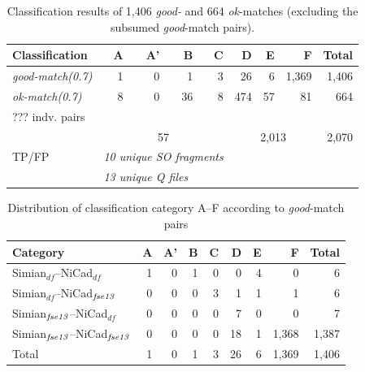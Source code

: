 \documentclass{IEEEtran}
\begin{document}
\begin{table}[H]
	\centering
	\caption{Classification results of 1,406 \textit{good-} and 664 \textit{ok}-matches (excluding the subsumed \textit{good}-match pairs).}
	\label{tab:classification}
	\begin{tabular}{|l|r|r|r|r|r|r|r|r|}
		\hline 
		Classification & A & A' & B & C & D & E & F & Total \\ 
		\hline 
		\multirow{1}{*}{\textit{good-match(0.7)}} & 1 & 0 & 1 & 3 & 26 & 6 & 1,369 & 1,406 \\ \cline{2-8}
		\hline
		\multirow{1}{*}{\textit{ok-match(0.7)}} & 8  & 0 & 36 & 8 & 474 & 57 & 81 & 664 \\ \cline{2-8}
		\hline
		\multirow{1}{*}{??? indv. pairs} &  & &  &  &  &  &  &  \\
		\hline
		\multirow{3}{*}{TP/FP} & \multicolumn{4}{c|}{57} & \multicolumn{3}{c|}{2,013} & 2,070 \\ 
	    & \multicolumn{4}{l|}{\textit{10 unique SO fragments}} & \multicolumn{3}{c|}{} & \\
	    & \multicolumn{4}{l|}{\textit{13 unique Q files}} & \multicolumn{3}{c|}{} & \\
		\hline
	\end{tabular} 
\end{table}

\begin{table}[H]
	\centering
	\caption{Distribution of classification category A--F according to \textit{good}-match pairs}
	\label{tab:good_classification}
\begin{tabular}{|l|r|r|r|r|r|r|r|r|}
	\hline 
	Category   & A   & 	A'   & 	B   & C   & D   &	E   &	F   & Total  \\
	\hline
	Simian$_{df}$--NiCad$_{df}$   & 1 & 0 & 1 & 0 & 0 & 4 & 0 & 6 \\
	Simian$_{df}$--NiCad$_{\textrm{\textit{fse13}}}$   & 0 & 0 & 0 & 3 & 1 & 1 & 1 & 6 \\
	Simian$_{\textrm{\textit{fse13}}}$--NiCad$_{df}$   & 0 & 0 & 0 & 0 & 7 & 0 & 0 & 7 \\
	Simian$_{\textrm{\textit{fse13}}}$--NiCad$_{\textrm{\textit{fse13}}}$   & 0 & 0 & 0 & 0 & 18 & 1 & 1,368 & 1,387 \\
	\hline
	Total   &   1   &   0   &   1   &   3   &   26   &   6   & 1,369  & 1,406 \\
	\hline
\end{tabular} 
\end{table}
\end{document}
